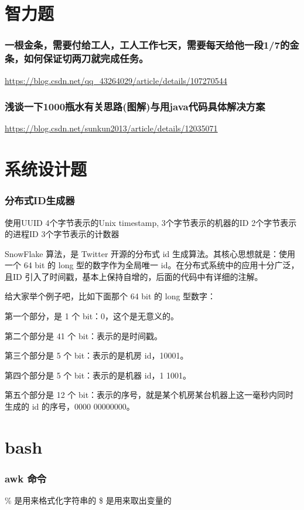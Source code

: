 \documentclass[UTF8]{ctexart}
\begin{document}
\section{智力题}

\subsubsection{一根金条，需要付给工人，工人工作七天，需要每天给他一段1/7的金条，如何保证切两刀就完成任务。}
\url{https://blog.csdn.net/qq_43264029/article/details/107270544}

\subsubsection{浅谈一下1000瓶水有关思路(图解)与用java代码具体解决方案}
\url{https://blog.csdn.net/sunkun2013/article/details/12035071}


\section{系统设计题}
\subsubsection{分布式ID生成器}

使用UUID
4个字节表示的Unix timestamp,
3个字节表示的机器的ID
2个字节表示的进程ID
3个字节表示的计数器

SnowFlake 算法，是 Twitter 开源的分布式 id 生成算法。其核心思想就是：使用一个 64 bit 的 long 型的数字作为全局唯一 id。在分布式系统中的应用十分广泛，且ID 引入了时间戳，基本上保持自增的，后面的代码中有详细的注解。

给大家举个例子吧，比如下面那个 64 bit 的 long 型数字：

第一个部分，是 1 个 bit：0，这个是无意义的。

第二个部分是 41 个 bit：表示的是时间戳。

第三个部分是 5 个 bit：表示的是机房 id，10001。

第四个部分是 5 个 bit：表示的是机器 id，1 1001。

第五个部分是 12 个 bit：表示的序号，就是某个机房某台机器上这一毫秒内同时生成的 id 的序号，0000 00000000。

\section{bash}



\subsubsection{awk 命令}
\% 是用来格式化字符串的
\$ 是用来取出变量的
\end{document}
